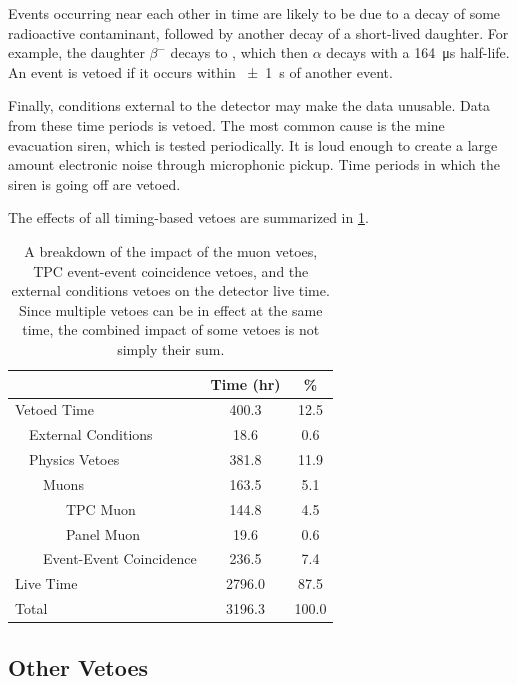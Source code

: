 \documentclass[herrin-thesis.tex]{subfiles}
\begin{document}
Events occurring near each other in time are likely to be due to a decay of some radioactive contaminant, followed by another decay of a short-lived daughter. For example, the  daughter  \(\beta^{-}\) decays to , which then \(\alpha\) decays with a \SI{164}{\micro\s} half-life.  An event is vetoed if it occurs within \SI{\pm1}{\s} of another event.

Finally, conditions external to the detector may make the data unusable. Data from these time periods is vetoed. The most common cause is the mine evacuation siren, which is tested periodically. It is loud enough to create a large amount electronic noise through microphonic pickup. Time periods in which the siren is going off are vetoed.

The effects of all timing-based vetoes are summarized in \cref{tab:analysis_veto_effects}.

\begin{table}[htbp]
\centering
\caption[Impact of timing-based vetoes]{A breakdown of the impact of the muon vetoes, TPC event-event coincidence vetoes, and the external conditions vetoes on the detector live time. Since multiple vetoes can be in effect at the same time, the combined impact of some vetoes is not simply their sum.}
\label{tab:analysis_veto_effects}
\begin{tabular}{l l l l c c}\toprule
\multicolumn{4}{c}{}							&	Time (\si{hr})	&	\%	\\\midrule
\multicolumn{4}{l}{Vetoed Time}				&	400.3		&	12.5	\\
	&\multicolumn{3}{l}{External Conditions}		&	18.6			&	0.6	\\
	&\multicolumn{3}{l}{Physics Vetoes}			&	381.8		&	11.9	\\
	&&\multicolumn{2}{l}{Muons}				&	163.5		&	5.1	\\
	&&&TPC Muon							&	144.8		&	4.5	\\
	&&&Panel Muon						&	19.6			&	0.6	\\
	&&\multicolumn{2}{l}{Event-Event Coincidence}&	236.5		&	7.4	\\
\multicolumn{4}{l}{Live Time}					&	2796.0		&	87.5	\\\midrule
\multicolumn{4}{l}{Total}						&	3196.3		&	100.0\\\bottomrule
\end{tabular}
\end{table}

\subsection{Other Vetoes}
\end{document}
